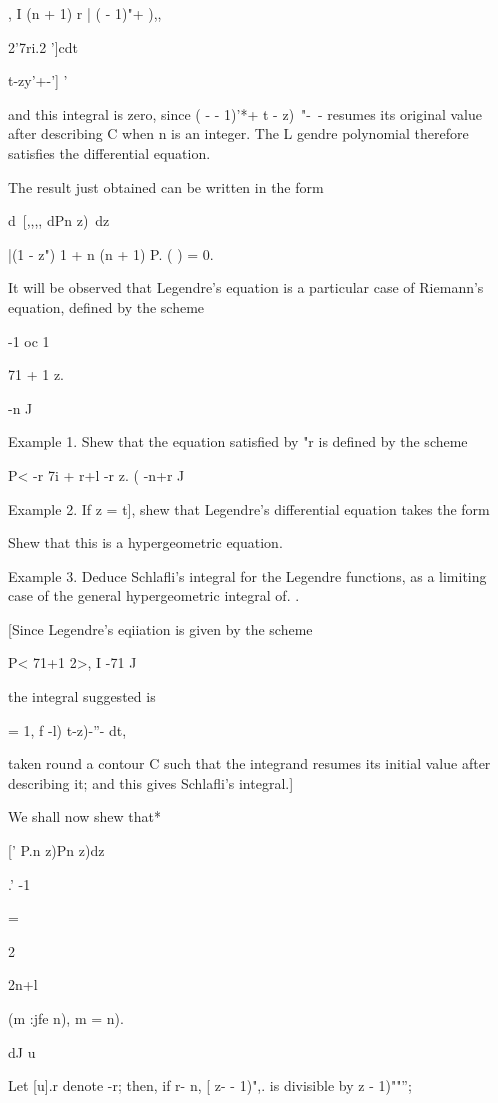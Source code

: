, I (n + 1) r | ( - 1)"+ ),,

  2'7ri.2 ']cdt\ \ {t-zy'+-'] '

and this integral is zero, since ( - - 1)'*+ t - z)~"-~- resumes its
original value after describing C when n is an integer. The L gendre
polynomial therefore satisfies the differential equation.

The result just obtained can be written in the form

d\ [,,,, dPn z)\ dz

|(1 - z") 1 + n (n + 1) P. ( ) = 0.

It will be observed that Legendre's equation is a particular case of
Riemann's equation, defined by the scheme

-1 oc 1

71 + 1 z.

-n J

Example 1. Shew that the equation satisfied by "r is defined by the
scheme

P< -r 7i + r+l -r z. ( -n+r J

Example 2. If z = t], shew that Legendre's differential equation takes
the form

Shew that this is a hypergeometric equation.

Example 3. Deduce Schlafli's integral for the Legendre functions, as a
limiting case of the general hypergeometric integral of. .

[Since Legendre's eqiiation is given by the scheme

P< 71+1 2>, I -71 J

the integral suggested is

%
%

= 1, f -l) t-z)-''- dt,

taken round a contour C such that the integrand resumes its initial
value after describing it; and this gives Schlafli's integral.]

We shall now shew that*

[' P.n z)Pn z)dz

.' -1

=

2

2n+l

(m :jfe n), m = n).

dJ u

Let [u].r denote -r; then, if r- n, [ z- - 1)",. is divisible by z -
1)""'';

}
